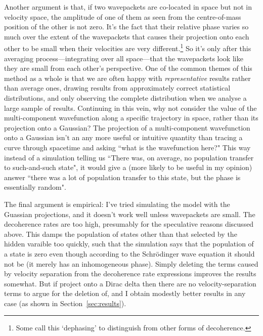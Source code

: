 Another argument is that, if two wavepackets are co-located in space but not in velocity space, the amplitude of one of them as seen from the centre-of-mass position of the other is not zero. It's the fact that their relative phase varies so much over the extent of the wavepackets that causes their projection onto each other to be small when their velocities are very different.\footnote{Some call this `dephasing' to distinguish from other forms of decoherence.} So it's only after this averaging process---integrating over all space---that the wavepackets look like they are small from each other's perspective. One of the common themes of this method as a whole is that we are often happy with \emph{representative} results rather than average ones, drawing results from approximately correct statistical distributions, and only observing the complete distribution when we analyse a large sample of results. Continuing in this vein, why not consider the value of the multi-component wavefunction along a specific trajectory in space, rather than its projection onto a Gaussian? The projection of a multi-component wavefunction onto a Gaussian isn't an any more useful or intuitive quantity than tracing a curve through spacetime and asking ``what is the wavefunction here?" This way instead of a simulation telling us ``There was, on average, no population transfer to such-and-such state", it would give a (more likely to be useful in my opinion) answer ``there was a lot of population transfer to this state, but the phase is essentially random". 

The final argument is empirical: I've tried simulating the model with the Guassian projections, and it doesn't work well unless wavepackets are small. The decoherence rates are too high, presumably for the speculative reasons discussed above. This damps the population of states other than that selected by the hidden varaible too quickly, such that the simulation says that the population of a state is zero even though according to the Schr\"odinger wave equation it should not be (it merely has an inhomogeneous phase). Simply deleting the terms caused by velocity separation from the decoherence rate expressions improves the results somewhat. But if project onto a Dirac delta then there are no velocity-separation terms to argue for the deletion of, and I obtain modestly better results in any case (as shown in Section~\ref{sec:results}).

